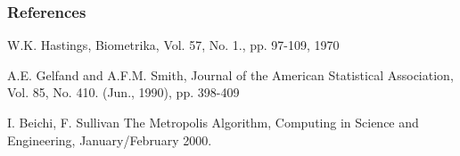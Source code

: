 \documentclass[mathserif,notes]{beamer}
\begin{document}
\begin{frame}[allowframebreaks]
  \frametitle<presentation>{References}    
  \begin{thebibliography}{10}    

 \beamertemplatearticlebibitems
  W.K. Hastings, Biometrika, Vol. 57, No. 1., pp. 97-109, 1970

 \beamertemplatearticlebibitems
  A.E. Gelfand and A.F.M. Smith,  Journal of the American Statistical Association, Vol. 85, No. 410. (Jun., 1990), pp. 398-409

 \beamertemplatearticlebibitems
I. Beichi, F. Sullivan
  \newblock The Metropolis Algorithm, Computing in Science and Engineering, January/February 2000.

 \end{thebibliography}
 \end{frame}
\end{document}

